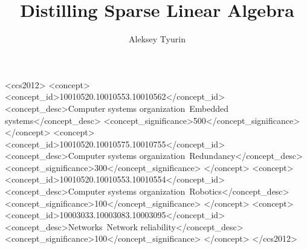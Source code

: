 \documentclass[acmsmall,review,nonacm]{acmart}\settopmatter{printfolios=true,printccs=false,printacmref=false}
\begin{document}
\title{Distilling Sparse Linear Algebra}

\author{Aleksey Tyurin}

\newcommand\todo[1]{{\color{violet}#1}}
\newcommand\db[1]{{\color{red}#1}}
\newcommand\question[1]{{\color{cyan}#1}}





  

\begin{CCSXML}
<ccs2012>
 <concept>
  <concept_id>10010520.10010553.10010562</concept_id>
  <concept_desc>Computer systems organization~Embedded systems</concept_desc>
  <concept_significance>500</concept_significance>
 </concept>
 <concept>
  <concept_id>10010520.10010575.10010755</concept_id>
  <concept_desc>Computer systems organization~Redundancy</concept_desc>
  <concept_significance>300</concept_significance>
 </concept>
 <concept>
  <concept_id>10010520.10010553.10010554</concept_id>
  <concept_desc>Computer systems organization~Robotics</concept_desc>
  <concept_significance>100</concept_significance>
 </concept>
 <concept>
  <concept_id>10003033.10003083.10003095</concept_id>
  <concept_desc>Networks~Network reliability</concept_desc>
  <concept_significance>100</concept_significance>
 </concept>
</ccs2012>
\end{CCSXML}
\end{document}
